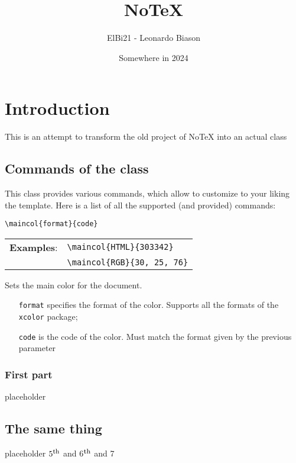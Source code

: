\documentclass[foo]{notex}
\title{NoTeX}
\author{ElBi21 - Leonardo Biason}
\date{Somewhere in 2024}
\begin{document}
\maketitle

\chapter{Introduction}

\noindent This is an attempt to transform the old project of NoTeX into an actual class

\section{Commands of the class}

This class provides various commands, which allow to customize to your liking the template. Here is a list of all the supported (and provided) commands:

\begin{tcolorbox}
    \verb|\maincol{format}{code}|
    \tcblower
    \begin{tabular}{r l}
        \textbf{Examples}: & \verb|\maincol{HTML}{303342}| \\ 
                     & \verb|\maincol{RGB}{30, 25, 76}|
    \end{tabular}
\end{tcolorbox}

\noindent Sets the main color for the document.
\begin{itemize}
    \item [\texttt{format}] specifies the format of the color. Supports all the formats of the \texttt{xcolor} package;
    \item [\texttt{code}] is the code of the color. Must match the format given by the previous parameter
\end{itemize}

\subsection{First part}

placeholder

\section{The same thing}

placeholder $5\nth$ and 6$\nth$ and 7\nth
\end{document}
